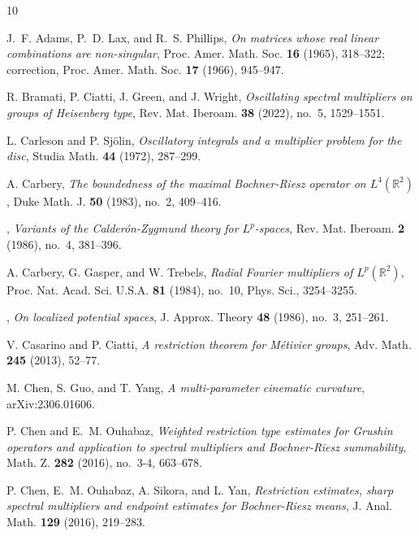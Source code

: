 \documentclass[leqno]{amsart}
\theoremstyle{definition}
\theoremstyle{remark}
\numberwithin{equation}{section}
\begin{document}
\begin{thebibliography}{10}

J.~F. Adams, P.~D. Lax, and R.~S. Phillips, \emph{On matrices whose real
  linear combinations are non-singular}, Proc. Amer. Math. Soc. \textbf{16}
  (1965), 318--322; correction, Proc. Amer. Math. Soc. \textbf{17} (1966),
  945--947. 

R. Bramati, P. Ciatti, J. Green, and J. Wright, \emph{Oscillating spectral
  multipliers on groups of Heisenberg type}, Rev. Mat. Iberoam. \textbf{38}
  (2022), no.~5, 1529--1551. 

L. Carleson and P. Sjölin, \emph{Oscillatory integrals and a multiplier
  problem for the disc}, Studia Math. \textbf{44} (1972), 287--299.
 
A. Carbery, \emph{The boundedness of the maximal {B}ochner-{R}iesz
  operator on {$L^{4}({\mathbb R}^{2})$}}, Duke Math. J. \textbf{50} (1983),
  no.~2, 409--416. 

\bysame, \emph{Variants of the {C}alder\'{o}n-{Z}ygmund theory for
  {$L^p$}-spaces}, Rev. Mat. Iberoam. \textbf{2} (1986), no.~4, 381--396.

A. Carbery, G. Gasper, and W. Trebels, \emph{Radial {F}ourier
  multipliers of {$L^{p}(\mathbb{R}^{2})$}}, Proc. Nat. Acad. Sci. U.S.A.
  \textbf{81} (1984), no.~10, Phys. Sci., 3254--3255. 

\bysame, \emph{On localized potential spaces}, J. Approx. Theory
  \textbf{48} (1986), no.~3, 251--261. 

V. Casarino and P. Ciatti, \emph{A restriction theorem for
  {M}étivier groups}, Adv. Math. \textbf{245} (2013), 52--77.

M. Chen, S. Guo, and T. Yang, \emph{A multi-parameter cinematic curvature},
  arXiv:2306.01606.

P. Chen and E.~M. Ouhabaz, \emph{Weighted restriction type estimates for
  {G}rushin operators and application to spectral multipliers and
  {B}ochner-{R}iesz summability}, Math. Z. \textbf{282} (2016), no.~3-4,
  663--678. 

P. Chen, E.~M. Ouhabaz, A. Sikora, and L. Yan, \emph{Restriction
  estimates, sharp spectral multipliers and endpoint estimates for
  {B}ochner-{R}iesz means}, J. Anal. Math. \textbf{129} (2016), 219--283.


\end{thebibliography}
\end{document}
